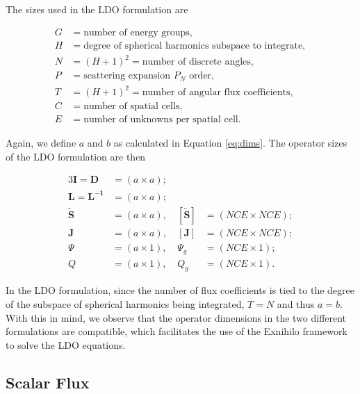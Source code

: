 \documentclass{article} %
\newcommand{\ve}[1]{\ensuremath{\mathbf{#1}}}
\begin{document}
\noindent The sizes used in the LDO formulation are

\begin{equation*}
  \begin{aligned}
    G &= \text{number of energy groups},\\
    H &= \text{degree of spherical harmonics subspace to integrate},\\
    N &= (H+1)^2 = \text{number of discrete angles},\\
    P &= \text{scattering expansion $P_N$ order},\\
    T &= (H+1)^2 = \text{number of angular flux coefficients},\\
    C &= \text{number of spatial cells},\\
    E &= \text{number of unknowns per spatial cell}.
  \end{aligned}
\end{equation*}

\noindent Again, we define $a$ and $b$ as calculated in Equation \ref{eq:dims}.
The operator sizes of the LDO formulation are then

\begin{alignat*}{3}
\ve{I} = \ve{D} &=      (a \times a); \\
\ve{L} = \ve{L^{-1}} &= (a \times a); \\
\ve{\tilde{S}} &=      (a \times a),\ &[\ve{\tilde{S}}] &= (NCE \times NCE); \\
\ve{J} &=              (a \times a),\ &[\ve{J}] &= (NCE \times NCE); \\
\Psi &=                (a \times 1),\ &\Psi_g   &= (NCE \times 1); \\
Q &=                   (a \times 1),\ &Q_g      &= (NCE \times 1).
\end{alignat*}

\noindent In the LDO formulation, since the number of flux coefficients is tied
to the degree of the subspace of spherical harmonics being integrated, $T = N$
and thus $a = b$. With this in mind, we observe that the operator dimensions in
the two different formulations are compatible, which facilitates the use of the
Exnihilo framework to solve the LDO equations.

\subsection{Scalar Flux}
\label{sec:flux}
\end{document}
